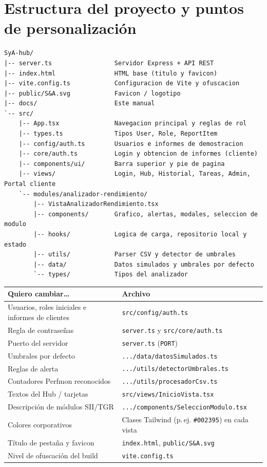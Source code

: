 \documentclass[11pt,a4paper]{article}
\newcommand{\ruta}[1]{\texttt{#1}}
\begin{document}
\section{Estructura del proyecto y puntos de personalización}\label{sec:estructura}

\begin{lstlisting}
SyA-hub/
|-- server.ts                 Servidor Express + API REST
|-- index.html                HTML base (titulo y favicon)
|-- vite.config.ts            Configuracion de Vite y ofuscacion
|-- public/S&A.svg            Favicon / logotipo
|-- docs/                     Este manual
`-- src/
    |-- App.tsx               Navegacion principal y reglas de rol
    |-- types.ts              Tipos User, Role, ReportItem
    |-- config/auth.ts        Usuarios e informes de demostracion
    |-- core/auth.ts          Login y obtencion de informes (cliente)
    |-- components/ui/        Barra superior y pie de pagina
    |-- views/                Login, Hub, Historial, Tareas, Admin, Portal cliente
    `-- modules/analizador-rendimiento/
        |-- VistaAnalizadorRendimiento.tsx
        |-- components/       Grafico, alertas, modales, seleccion de modulo
        |-- hooks/            Logica de carga, repositorio local y estado
        |-- utils/            Parser CSV y detector de umbrales
        |-- data/             Datos simulados y umbrales por defecto
        `-- types/            Tipos del analizador
\end{lstlisting}

\begin{center}
\begin{tabularx}{\linewidth}{Xl}
\toprule
\textbf{Quiero cambiar\ldots} & \textbf{Archivo} \\
\midrule
Usuarios, roles iniciales e informes de clientes & \ruta{src/config/auth.ts} \\
Regla de contraseñas            & \ruta{server.ts} y \ruta{src/core/auth.ts} \\
Puerto del servidor             & \ruta{server.ts} (\texttt{PORT}) \\
Umbrales por defecto            & \ruta{.../data/datosSimulados.ts} \\
Reglas de alerta                & \ruta{.../utils/detectorUmbrales.ts} \\
Contadores Perfmon reconocidos  & \ruta{.../utils/procesadorCsv.ts} \\
Textos del Hub / tarjetas       & \ruta{src/views/InicioVista.tsx} \\
Descripción de módulos SII/TGR  & \ruta{.../components/SeleccionModulo.tsx} \\
Colores corporativos            & Clases Tailwind (p.\,ej. \texttt{\#002395}) en cada vista \\
Título de pestaña y favicon     & \ruta{index.html}, \ruta{public/S\&A.svg} \\
Nivel de ofuscación del build   & \ruta{vite.config.ts} \\
\bottomrule
\end{tabularx}
\end{center}
\end{document}

